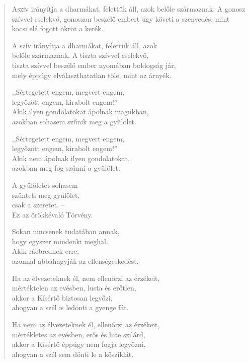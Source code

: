 
\begin{verse}

{\par%
\lettrine[slope=0.5em]{A}{szív} {\LettrineTextFont irányítja a dharmákat, felettük áll, azok}\newline
belőle származnak. A gonosz szívvel cselekvő,\newline
gonoszan beszélő embert úgy követi a szenvedés,\verselinebreak
mint kocsi elé fogott ökröt a kerék.
\par}

 A szív irányítja a dharmákat, felettük áll, azok\\
belőle származnak. A tiszta szívvel cselekvő,\\
tiszta szívvel beszélő ember nyomában boldogság jár,\\
mely éppúgy elválaszthatatlan tőle, mint az árnyék.

 ,,Sértegetett engem, megvert engem,\\
legyőzött engem, kirabolt engem!''\\
Akik ilyen gondolatokat ápolnak magukban,\\
azokban sohasem szűnik meg a gyűlölet.

 ,,Sértegetett engem, megvert engem,\\
legyőzött engem, kirabolt engem!''\\
Akik nem ápolnak ilyen gondolatokat,\\
azokban meg fog szűnni a gyűlölet.

 A gyűlöletet sohasem\\
szünteti meg gyűlölet,\\
csak a szeretet. --\\
Ez az örökkévaló Törvény.

 Sokan nincsenek tudatában annak,\\
hogy egyszer mindenki meghal.\\
Akik ráébrednek erre,\\
azonnal abbahagyják az ellenségeskedést.

 Ha az élvezeteknek él, nem ellenőrzi az érzékeit,\\
mértéktelen az evésben, lusta és erőtlen,\\
akkor a Kísértő biztosan legyőzi,\\
ahogyan a szél is ledönti a gyenge fát.

 Ha nem az élvezeteknek él, ellenőrzi az érzékeit,\\
mértékletes az evésben, erős és hite szilárd,\\
akkor a Kísértő éppúgy nem fogja legyőzni,\\
ahogyan a szél sem dönti le a kősziklát.


\end{verse}
